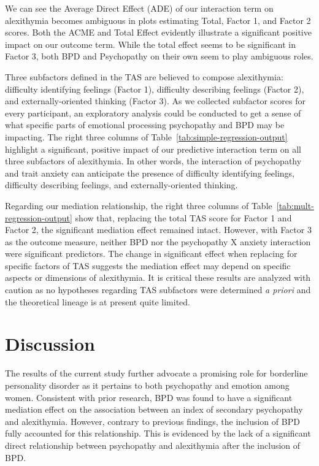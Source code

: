 \documentclass[
  man,floatsintext]{apa7}
\begin{document}
We can see the Average Direct Effect (ADE) of our interaction term on alexithymia becomes ambiguous in plots estimating Total, Factor 1, and Factor 2 scores. Both the ACME and Total Effect evidently illustrate a significant positive impact on our outcome term. While the total effect seems to be significant in Factor 3, both BPD and Psychopathy on their own seem to play ambiguous roles.

Three subfactors defined in the TAS are believed to compose alexithymia: difficulty identifying feelings (Factor 1), difficulty describing feelings (Factor 2), and externally-oriented thinking (Factor 3). As we collected subfactor scores for every participant, an exploratory analysis could be conducted to get a sense of what specific parts of emotional processing psychopathy and BPD may be impacting. The right three columns of Table~\ref{tab:simple-regression-output} highlight a significant, positive impact of our predictive interaction term on all three subfactors of alexithymia. In other words, the interaction of psychopathy and trait anxiety can anticipate the presence of difficulty identifying feelings, difficulty describing feelings, and externally-oriented thinking.

Regarding our mediation relationship, the right three columns of Table~\ref{tab:mult-regression-output} show that, replacing the total TAS score for Factor 1 and Factor 2, the significant mediation effect remained intact. However, with Factor 3 as the outcome measure, neither BPD nor the psychopathy X anxiety interaction were significant predictors. The change in significant effect when replacing for specific factors of TAS suggests the mediation effect may depend on specific aspects or dimensions of alexithymia. It is critical these results are analyzed with caution as no hypotheses regarding TAS subfactors were determined \emph{a priori} and the theoretical lineage is at present quite limited.

\hypertarget{discussion}{%
\section{Discussion}\label{discussion}}

The results of the current study further advocate a promising role for borderline personality disorder as it pertains to both psychopathy and emotion among women. Consistent with prior research, BPD was found to have a significant mediation effect on the association between an index of secondary psychopathy and alexithymia. However, contrary to previous findings, the inclusion of BPD fully accounted for this relationship. This is evidenced by the lack of a significant direct relationship between psychopathy and alexithymia after the inclusion of BPD.
\end{document}
